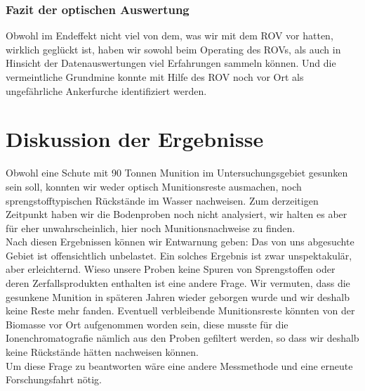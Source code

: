 \subsubsection{Fazit der optischen Auswertung}
Obwohl im Endeffekt nicht viel von dem, was wir mit dem ROV vor hatten, wirklich geglückt ist, haben wir sowohl beim Operating des ROVs, als auch in Hinsicht der Datenauswertungen viel Erfahrungen sammeln können. Und die vermeintliche Grundmine konnte mit Hilfe des ROV noch vor Ort als ungefährliche Ankerfurche identifiziert werden.




\section{Diskussion der Ergebnisse}
Obwohl eine Schute mit 90 Tonnen Munition im Untersuchungsgebiet gesunken sein soll\cite{schiffsschicksale}, konnten wir weder optisch Munitionsreste ausmachen, noch sprengstofftypischen Rückstände im Wasser nachweisen. Zum derzeitigen Zeitpunkt haben wir die Bodenproben noch nicht analysiert, wir halten es aber für eher unwahrscheinlich, hier noch Munitionsnachweise zu finden.
\\
Nach diesen Ergebnissen können wir Entwarnung geben: Das von uns abgesuchte Gebiet ist offensichtlich unbelastet. Ein solches Ergebnis ist zwar unspektakulär, aber erleichternd. Wieso 
unsere Proben keine Spuren von Sprengstoffen oder deren Zerfallsprodukten 
enthalten ist eine andere Frage. Wir vermuten, dass die gesunkene Munition in späteren Jahren wieder geborgen wurde und wir deshalb keine Reste mehr fanden.
Eventuell verbleibende Munitionsreste könnten von der Biomasse vor Ort aufgenommen worden sein, diese musste für die Ionenchromatografie nämlich aus den Proben gefiltert werden, so dass wir deshalb keine Rückstände hätten nachweisen können. \\ 
Um diese Frage zu beantworten wäre eine andere Messmethode und eine erneute Forschungsfahrt nötig.